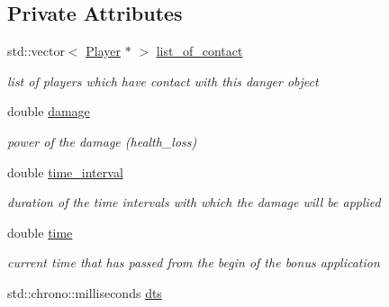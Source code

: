 \subsection*{Private Attributes}
\begin{DoxyCompactItemize}
\item 
\mbox{\label{class_danger_object_a3b032f295d584177435e4ee71e8a0647}} 
std\+::vector$<$ \hyperlink{class_player}{Player} $\ast$ $>$ \hyperlink{class_danger_object_a3b032f295d584177435e4ee71e8a0647}{list\+\_\+of\+\_\+contact}
\begin{DoxyCompactList}\small\item\em list of players which have contact with this danger object \end{DoxyCompactList}\item 
\mbox{\label{class_danger_object_a81602fd52def64c26dd7ae488d523111}} 
double \hyperlink{class_danger_object_a81602fd52def64c26dd7ae488d523111}{damage}
\begin{DoxyCompactList}\small\item\em power of the damage (health\+\_\+loss) \end{DoxyCompactList}\item 
\mbox{\label{class_danger_object_a1a5e8ba303583a6a1dae79b218e07f6f}} 
double \hyperlink{class_danger_object_a1a5e8ba303583a6a1dae79b218e07f6f}{time\+\_\+interval}
\begin{DoxyCompactList}\small\item\em duration of the time intervals with which the damage will be applied \end{DoxyCompactList}\item 
\mbox{\label{class_danger_object_a47bc7031c9d5afd3dffc902e464e6911}} 
double \hyperlink{class_danger_object_a47bc7031c9d5afd3dffc902e464e6911}{time}
\begin{DoxyCompactList}\small\item\em current time that has passed from the begin of the bonus application \end{DoxyCompactList}\item 
\mbox{\label{class_danger_object_a2cb289f3bf483c5e73282342ced2bd77}} 
std\+::chrono\+::milliseconds \hyperlink{class_danger_object_a2cb289f3bf483c5e73282342ced2bd77}{dts}

\end{DoxyCompactItemize}
